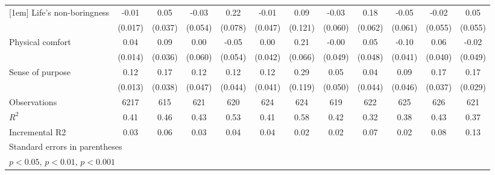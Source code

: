 {\begin{tabular}{l*{11}{c}}
[1em]
Life's non-boringness&    -0.01         &     0.05         &    -0.03         &     0.22\sym{**} &    -0.01         &     0.09         &    -0.03         &     0.18\sym{**} &    -0.05         &    -0.02         &     0.05         \\
                &  (0.017)         &  (0.037)         &  (0.054)         &  (0.078)         &  (0.047)         &  (0.121)         &  (0.060)         &  (0.062)         &  (0.061)         &  (0.055)         &  (0.055)         \\
[1em]
Physical comfort&     0.04\sym{**} &     0.09\sym{*}  &     0.00         &    -0.05         &     0.00         &     0.21\sym{**} &    -0.00         &     0.05         &    -0.10\sym{*}  &     0.06         &    -0.02         \\
                &  (0.014)         &  (0.036)         &  (0.060)         &  (0.054)         &  (0.042)         &  (0.066)         &  (0.049)         &  (0.048)         &  (0.041)         &  (0.040)         &  (0.049)         \\
[1em]
Sense of purpose&     0.12\sym{***}&     0.17\sym{***}&     0.12\sym{**} &     0.12\sym{**} &     0.12\sym{**} &     0.29\sym{*}  &     0.05         &     0.04         &     0.09\sym{*}  &     0.17\sym{***}&     0.17\sym{***}\\
                &  (0.013)         &  (0.038)         &  (0.047)         &  (0.044)         &  (0.041)         &  (0.119)         &  (0.050)         &  (0.044)         &  (0.046)         &  (0.037)         &  (0.029)         \\
\hline
Observations    &     6217         &      615         &      621         &      620         &      624         &      624         &      619         &      622         &      625         &      626         &      621         \\
\(R^{2}\)       &     0.41         &     0.46         &     0.43         &     0.53         &     0.41         &     0.58         &     0.42         &     0.32         &     0.38         &     0.43         &     0.37         \\
Incremental R2  &     0.03         &     0.06         &     0.03         &     0.04         &     0.04         &     0.02         &     0.02         &     0.07         &     0.02         &     0.08         &     0.13         \\
\hline\hline
\multicolumn{12}{l}{\footnotesize Standard errors in parentheses}\\
\multicolumn{12}{l}{\footnotesize \sym{*} \(p<0.05\), \sym{**} \(p<0.01\), \sym{***} \(p<0.001\)}\\
\end{tabular}
}
